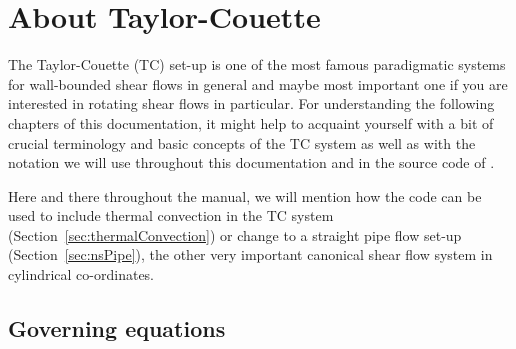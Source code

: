 \documentclass[a4paper, 11pt, DIV=11]{scrartcl}
\begin{document}
\section{About Taylor-Couette}
\label{sec:taylorCouette}

The Taylor-Couette (TC) set-up is one of the most famous paradigmatic systems
for wall-bounded shear flows in general and maybe  most important
one if you are interested in rotating shear flows in particular. For
understanding the following chapters of this documentation, it might help
to acquaint yourself with a bit of crucial terminology and basic
concepts of the TC system as well as with the notation we will use throughout
this documentation and in the source code of \nsc.
\par
Here and there throughout the manual, we will mention how the code can be used to
include thermal convection in the TC system (Section~\ref{sec:thermalConvection})
or change to a straight pipe flow set-up (Section~\ref{sec:nsPipe}), the other very
important canonical shear flow system in cylindrical co-ordinates.

\subsection{Governing equations}
\label{sec:governingEquations}
\end{document}

